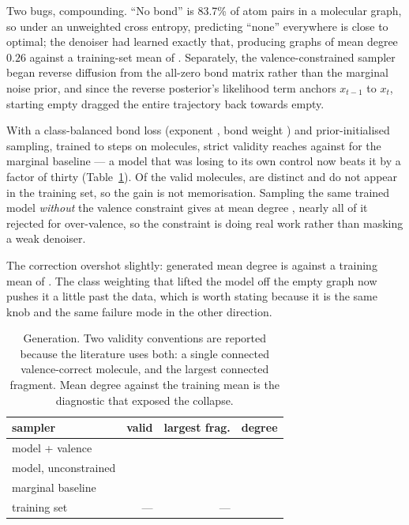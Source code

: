 Two bugs, compounding. ``No bond'' is 83.7\% of atom pairs in a molecular graph, so
under an unweighted cross entropy, predicting ``none'' everywhere is close to
optimal; the denoiser had learned exactly that, producing graphs of mean degree
$0.26$ against a training-set mean of \genTrainDegree{}. Separately, the
valence-constrained sampler began reverse diffusion from the all-zero bond matrix
rather than the marginal noise prior, and since the reverse posterior's likelihood
term anchors $x_{t-1}$ to $x_t$, starting empty dragged the entire trajectory back
towards empty.

With a class-balanced bond loss (exponent \genClassBalance{}, bond weight
\genBondWeight{}) and prior-initialised sampling, trained to \genSteps{} steps on
\genTrainMolecules{} molecules, strict validity reaches \genModelValidity{} against
\genBaselineValidity{} for the marginal baseline --- a model that was losing to its
own control now beats it by a factor of thirty (Table~\ref{tab:generation}). Of the
valid molecules, \genModelUnique{} are distinct and \genModelNovel{} do not appear in
the training set, so the gain is not memorisation. Sampling the same trained model
\emph{without} the valence constraint gives \genUnconstrainedValidity{} at mean degree
\genUnconstrainedDegree{}, nearly all of it rejected for over-valence, so the
constraint is doing real work rather than masking a weak denoiser.

The correction overshot slightly: generated mean degree is \genModelDegree{} against a
training mean of \genTrainDegree{}. The class weighting that lifted the model off the
empty graph now pushes it a little past the data, which is worth stating because it is
the same knob and the same failure mode in the other direction.

\begin{table}[t]
\centering\small
\begin{tabular}{lrrr}
\toprule
sampler & valid & largest frag. & degree \\
\midrule
model + valence & \genModelValidity{} & \genModelFragment{} & \genModelDegree{} \\
model, unconstrained & \genUnconstrainedValidity{} & \genUnconstrainedFragment{} & \genUnconstrainedDegree{} \\
marginal baseline & \genBaselineValidity{} & \genBaselineFragment{} & \genBaselineDegree{} \\
\midrule
training set & --- & --- & \genTrainDegree{} \\
\bottomrule
\end{tabular}
\caption{Generation. Two validity conventions are reported because the literature
uses both: a single connected valence-correct molecule, and the largest connected
fragment. Mean degree against the training mean is the diagnostic that exposed the
collapse.}
\label{tab:generation}
\end{table}

